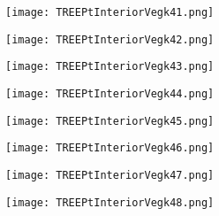 \documentclass[pdf]{beamer}
\begin{document}
\begin{frame}
\begin{figure}[!h]
\centering
\texttt{[image: TREEPtInteriorVegk41.png]}
\end{figure}
\end{frame}

\begin{frame}
\begin{figure}[!h]
\centering
\texttt{[image: TREEPtInteriorVegk42.png]}
\end{figure}
\end{frame}

\begin{frame}
\begin{figure}[!h]
\centering
\texttt{[image: TREEPtInteriorVegk43.png]}
\end{figure}
\end{frame}

\begin{frame}
\begin{figure}[!h]
\centering
\texttt{[image: TREEPtInteriorVegk44.png]}
\end{figure}
\end{frame}

\begin{frame}
\begin{figure}[!h]
\centering
\texttt{[image: TREEPtInteriorVegk45.png]}
\end{figure}
\end{frame}

\begin{frame}
\begin{figure}[!h]
\centering
\texttt{[image: TREEPtInteriorVegk46.png]}
\end{figure}
\end{frame}

\begin{frame}
\begin{figure}[!h]
\centering
\texttt{[image: TREEPtInteriorVegk47.png]}
\end{figure}
\end{frame}

\begin{frame}
\begin{figure}[!h]
\centering
\texttt{[image: TREEPtInteriorVegk48.png]}
\end{figure}
\end{frame}
\end{document}
